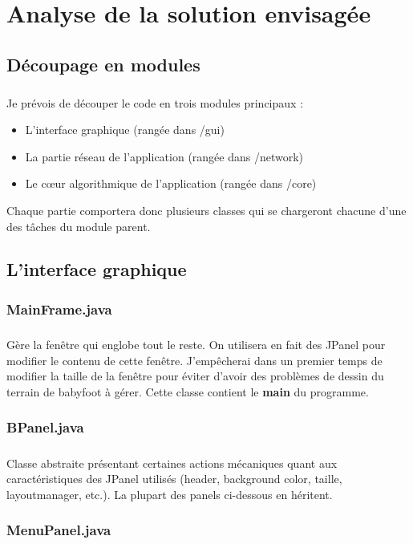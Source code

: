 \documentclass[a4paper,12pt]{report}
\begin{document}
\chapter{Analyse de la solution envisagée}
\section{Découpage en modules}
\paragraph{}
Je prévois de découper le code en trois modules principaux : 
\begin{itemize}
    \item L'interface graphique (rangée dans /gui)
    \item La partie réseau de l'application (rangée dans /network)
    \item Le c\oe{}ur algorithmique de l'application (rangée dans /core)
\end{itemize}
Chaque partie comportera donc plusieurs classes qui se chargeront chacune d'une des tâches du module parent.
\section{L'interface graphique}
\subsection{MainFrame.java}
\paragraph{}
Gère la fenêtre qui englobe tout le reste. On utilisera en fait des JPanel pour modifier le contenu de cette fenêtre. J'empêcherai dans un premier temps de modifier la taille de la fenêtre pour éviter d'avoir des problèmes de dessin du terrain de babyfoot à gérer. Cette classe contient le \textbf{main} du programme.
\subsection{BPanel.java}
\paragraph{}
Classe abstraite présentant certaines actions mécaniques quant aux caractéristiques des JPanel utilisés (header, background color, taille, layoutmanager, etc.). La plupart des panels ci-dessous en héritent.
\subsection{MenuPanel.java}
\end{document}
